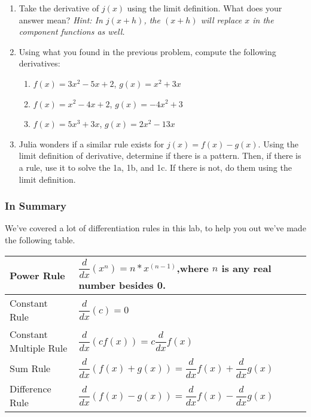 \documentclass{ximera}
\begin{document}
\begin{enumerate}
\item{Take the derivative of $j(x)$ using the limit definition. What does your answer mean? \textit{Hint: In $j(x+h)$, the $(x+h)$ will replace $x$ in the component functions as well.}}
\item{Using what you found in the previous problem, compute the following derivatives:
\begin{enumerate}
\item{$f(x) = 3x^2 - 5x + 2$, $g(x) = x^2 + 3x$}
\item{$f(x) = x^2 - 4x + 2$, $g(x) = -4x^2 + 3$}
\item{$f(x) = 5x^3 + 3x$, $g(x) = 2x^2 - 13x$}
\end{enumerate}
}
\item{Julia wonders if a similar rule exists for $j(x) = f(x)-g(x)$. Using the limit definition of derivative, determine if there is a pattern. Then, if there is a rule, use it to solve the 1a, 1b, and 1c. If there is not, do them using the limit definition.}
\end{enumerate}

\subsubsection{In Summary}
We've covered a lot of differentiation rules in this lab, to help you out we've made the following table.
\begin{center}
{\renewcommand{\arraystretch}{3}
\begin{tabular}{| l | p{7.5cm} |}
    \hline
    Power Rule & $\displaystyle \dfrac{d}{dx}(x^n)=n*x^{(n-1)}$,where $n$ is any real number besides 0. \\
    \hline
    Constant Rule & $\displaystyle\dfrac{d}{dx}(c) = 0$ \\
    \hline
    Constant Multiple Rule & $\displaystyle\dfrac{d}{dx}(cf(x))=c\dfrac{d}{dx}f(x)$ \\
    \hline
    Sum Rule & $\displaystyle\dfrac{d}{dx}(f(x)+g(x))=\dfrac{d}{dx}f(x)+\dfrac{d}{dx}g(x)$ \\
    \hline
    Difference Rule & $\displaystyle\dfrac{d}{dx}(f(x)-g(x))=\dfrac{d}{dx}f(x)-\dfrac{d}{dx}g(x)$ \\
    \hline
\end{tabular}}
\end{center}
\pagebreak
\end{document}
